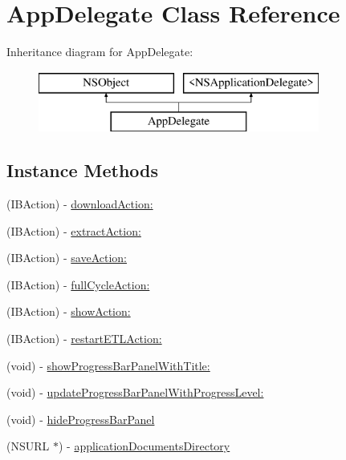 \hypertarget{interface_app_delegate}{\section{App\-Delegate Class Reference}
\label{interface_app_delegate}
}
Inheritance diagram for App\-Delegate\-:\begin{figure}[H]
\begin{center}
\leavevmode
\includegraphics[height=2.000000cm]{interface_app_delegate}
\end{center}
\end{figure}
\subsection*{Instance Methods}
\begin{DoxyCompactItemize}
\item 
(I\-B\-Action) -\/ \hyperlink{interface_app_delegate_abc32a8318005daad90b9b7c8777fa717}{download\-Action\-:}
\item 
(I\-B\-Action) -\/ \hyperlink{interface_app_delegate_a25c01131480f4c016d3bff46b5d5d45f}{extract\-Action\-:}
\item 
(I\-B\-Action) -\/ \hyperlink{interface_app_delegate_af4278d3e83f8205453817621b7526a95}{save\-Action\-:}
\item 
(I\-B\-Action) -\/ \hyperlink{interface_app_delegate_ab5c456d876553b65df6d026d09d88321}{full\-Cycle\-Action\-:}
\item 
(I\-B\-Action) -\/ \hyperlink{interface_app_delegate_ad8e942be603bf7f7dc319be0df4d4f58}{show\-Action\-:}
\item 
(I\-B\-Action) -\/ \hyperlink{interface_app_delegate_a9149a6fc6d3ee8f3563d24840e68b10e}{restart\-E\-T\-L\-Action\-:}
\item 
(void) -\/ \hyperlink{interface_app_delegate_acc522d4de99650a5cbb08383aad96db3}{show\-Progress\-Bar\-Panel\-With\-Title\-:}
\item 
(void) -\/ \hyperlink{interface_app_delegate_a0928e3515585bd37d073df64088e733a}{update\-Progress\-Bar\-Panel\-With\-Progress\-Level\-:}
\item 
(void) -\/ \hyperlink{interface_app_delegate_ad78c7cf3b686fdccbb2bf274ae588adc}{hide\-Progress\-Bar\-Panel}
\item 
(N\-S\-U\-R\-L $\ast$) -\/ \hyperlink{interface_app_delegate_a09e82eab31a341400477030e8b474b13}{application\-Documents\-Directory}
\end{DoxyCompactItemize}
